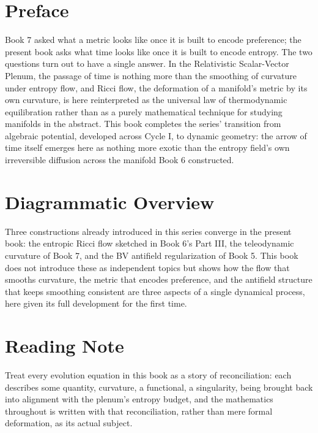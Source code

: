 \chapter*{Preface}

Book 7 asked what a metric looks like once it is built to encode preference; the present book asks what time looks like once it is built to encode entropy. The two questions turn out to have a single answer. In the Relativistic Scalar-Vector Plenum, the passage of time is nothing more than the smoothing of curvature under entropy flow, and Ricci flow, the deformation of a manifold's metric by its own curvature, is here reinterpreted as the universal law of thermodynamic equilibration rather than as a purely mathematical technique for studying manifolds in the abstract. This book completes the series' transition from algebraic potential, developed across Cycle I, to dynamic geometry: the arrow of time itself emerges here as nothing more exotic than the entropy field's own irreversible diffusion across the manifold Book 6 constructed.

\chapter*{Diagrammatic Overview}

Three constructions already introduced in this series converge in the present book: the entropic Ricci flow sketched in Book 6's Part III, the teleodynamic curvature of Book 7, and the BV antifield regularization of Book 5. This book does not introduce these as independent topics but shows how the flow that smooths curvature, the metric that encodes preference, and the antifield structure that keeps smoothing consistent are three aspects of a single dynamical process, here given its full development for the first time.

\chapter*{Reading Note}

Treat every evolution equation in this book as a story of reconciliation: each describes some quantity, curvature, a functional, a singularity, being brought back into alignment with the plenum's entropy budget, and the mathematics throughout is written with that reconciliation, rather than mere formal deformation, as its actual subject.

